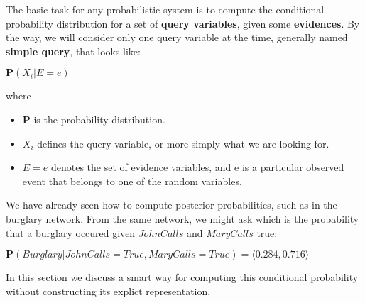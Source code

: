 The basic task for any probabilistic system is to compute the conditional probability distribution for a set of \textbf{query variables}, given some \textbf{evidences}. By the way,
we will consider only one query variable at the time, generally named \textbf{simple query}, that looks like:
\begin{center}
    $\mathbf{P}(X_i|E = e)$
\end{center}
where
\begin{itemize}
    \renewcommand{\labelitemi}{-}
    \item $\mathbf{P}$ is the probability distribution.
    \item $X_i$ defines the query variable, or more simply what we are looking for.
    \item $E = e$ denotes the set of evidence variables, and e is a particular observed event that belongs to one of the random variables.
\end{itemize} \vspace{3.5pt}

We have already seen how to compute posterior probabilities, such as in the burglary network. From the same network, we might ask which is the probability that a 
burglary occured given $JohnCalls$ and $MaryCalls$ true:
\begin{center}
    $\mathbf{P}(Burglary|JohnCalls=True, MaryCalls=True) = \langle 0.284, 0.716 \rangle$
\end{center}
In this section we discuss a smart way for computing this conditional probability without constructing its explict representation.